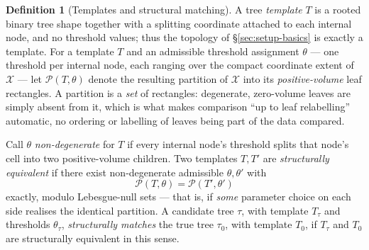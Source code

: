 \documentclass[11pt]{article}
\theoremstyle{plain}
\theoremstyle{definition}
\newtheorem{definition}[theorem]{Definition}
\theoremstyle{remark}
\newcommand{\cX}{\mathcal{X}}
\begin{document}
\begin{definition}[Templates and structural matching]
\label{def:structural-matching}
A tree \emph{template} \(T\) is a rooted binary tree shape together with a
splitting coordinate attached to each internal node, and no threshold values;
thus the topology of \S\ref{sec:setup-basics} is exactly a template. For a
template \(T\) and an admissible threshold assignment \(\theta\) --- one
threshold per internal node, each ranging over the compact coordinate extent
of \(\cX\) --- let \(\mathcal P(T,\theta)\) denote the resulting partition of
\(\cX\) into its \emph{positive-volume} leaf rectangles. A partition is a
\emph{set} of rectangles: degenerate, zero-volume leaves are simply absent
from it, which is what makes comparison ``up to leaf relabelling'' automatic,
no ordering or labelling of leaves being part of the data compared.

Call \(\theta\) \emph{non-degenerate} for \(T\) if every internal node's
threshold splits that node's cell into two positive-volume children. Two
templates \(T,T'\) are \emph{structurally equivalent} if there exist
non-degenerate admissible \(\theta,\theta'\) with
\[
  \mathcal P(T,\theta)=\mathcal P(T',\theta')
\]
exactly, modulo Lebesgue-null sets --- that is, if \emph{some} parameter
choice on each side realises the identical partition. A candidate tree
\(\tau\), with template \(T_\tau\) and thresholds \(\theta_\tau\),
\emph{structurally matches} the true tree \(\tau_0\), with template \(T_0\),
if \(T_\tau\) and \(T_0\) are structurally equivalent in this sense.


\end{definition}
\end{document}
